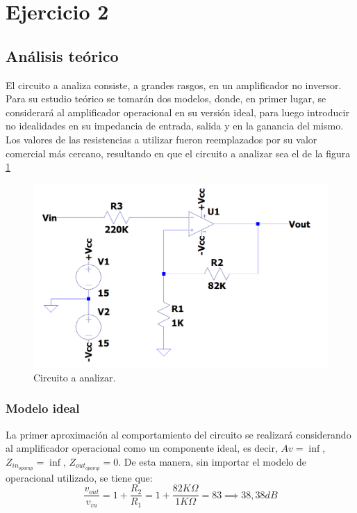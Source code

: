 
\section*{Ejercicio 2}
\subsection{Análisis teórico}
El circuito a analiza consiste, a grandes rasgos, en un amplificador no inversor.
Para su estudio teórico se tomarán dos modelos, donde, en primer lugar, se considerará al amplificador operacional en su versión ideal, para luego introducir no idealidades en su impedancia de entrada, salida y en la ganancia del mismo.
Los valores de las resistencias a utilizar fueron reemplazados por su valor comercial más cercano, resultando en que el circuito a analizar sea el de la figura \ref{fig:initial_circuit}
\begin{figure}[H]
    \begin{minipage}{\textwidth}
        \centering
        \includegraphics[width=\textwidth]{../EJ2/recursos_para_el_informe/circuito_a_analizar_ideal}
        \caption{Circuito a analizar.}
        \label{fig:initial_circuit}
    \end{minipage}\hfill
\end{figure}


\subsubsection{Modelo ideal}
La primer aproximación al comportamiento del circuito se realizará considerando al amplificador operacional como un componente ideal, es decir, $Av = \inf$, $Z_{in_{opamp}} = \inf$, $Z_{out_{opamp}} = 0$.
De esta manera, sin importar el modelo de operacional utilizado, se tiene que:
\begin{equation}
    \label{eq:ideal_gain}
    \frac{v_{out}}{v_{in}} = 1 + \frac{R_2}{R_1} = 1 + \frac{82 K\Omega}{1 K\Omega} = 83 \implies 38,38 dB
\end{equation}

